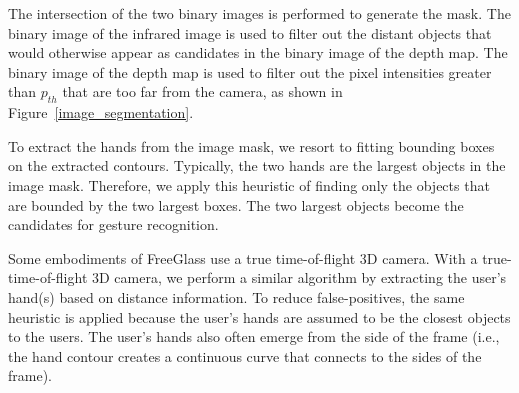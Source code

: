 The intersection of the two binary images is performed to generate the mask.
The binary image of the infrared image is used to filter out the distant
objects that would otherwise appear as candidates in the binary image of the
depth map.  The binary image of the depth map is used to filter out the
pixel intensities greater than $p_{th}$ that are too far from the camera,
as shown in Figure~\ref{image_segmentation}. 

To extract the hands from the image mask, we resort to fitting bounding boxes
on the extracted contours. Typically, the two hands are the largest objects in
the image mask. Therefore, we apply this heuristic of finding only the objects
that are bounded by the two largest boxes. The two largest objects become the
candidates for gesture recognition.

Some embodiments of FreeGlass use a true time-of-flight 3D camera.
With a true-time-of-flight 3D camera, we perform a similar algorithm by
extracting the user's hand(s) based on distance information. To reduce
false-positives, the same heuristic is applied because the user's hands are
assumed to be the closest objects to the users.  The user's hands also
often emerge from the side of the frame (i.e., the hand contour creates a
continuous curve that connects to the sides of the frame).


